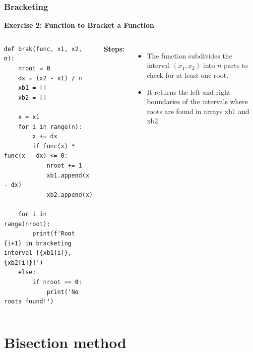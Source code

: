 \begin{frame}[fragile]
  \frametitle{Bracketing}

  \textbf{Exercise 2: Function to Bracket a Function}
  \begin{columns}
    \begin{lstlisting}
def brak(func, x1, x2, n):
    nroot = 0
    dx = (x2 - x1) / n
    xb1 = []
    xb2 = []

    x = x1
    for i in range(n):
        x += dx
        if func(x) * func(x - dx) <= 0:
            nroot += 1
            xb1.append(x - dx)
            xb2.append(x)

    for i in range(nroot):
        print(f'Root {i+1} in bracketing interval [{xb1[i]}, {xb2[i]}]')
    else:
        if nroot == 0:
            print('No roots found!')
    \end{lstlisting}
    \textbf{Steps:}
    \begin{itemize}
      \item The function subdivides the interval \((x_1, x_2)\) into \(n\) parts to check for at least one root.
      \item It returns the left and right boundaries of the intervals where roots are found in arrays xb1 and xb2.
    \end{itemize}
  \end{columns}
\end{frame}

\section{Bisection method}
